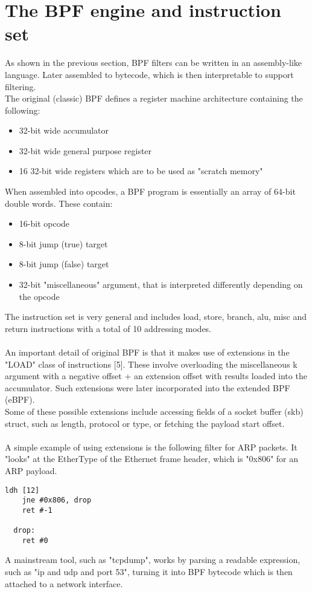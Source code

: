 \documentclass{l4proj}
\begin{document}
\section{The BPF engine and instruction set}
As shown in the previous section, BPF filters can be written in an assembly-like language. Later assembled to bytecode, which is then interpretable to support filtering.\\
The original (classic) BPF defines a register machine architecture containing the following:
\begin{itemize}
    \item 32-bit wide accumulator
    \item 32-bit wide general purpose register
    \item 16 32-bit wide registers which are to be used as "scratch memory"
\end{itemize}
When assembled into opcodes, a BPF program is essentially an array of 64-bit double words. These contain:
\begin{itemize}
    \item 16-bit opcode
    \item 8-bit jump (true) target
    \item 8-bit jump (false) target
    \item 32-bit "miscellaneous" argument, that is interpreted differently depending on the opcode
\end{itemize}
The instruction set is very general and includes load, store, branch, alu, misc and return instructions with a total of 10 addressing modes.\\\\
An important detail of original BPF is that it makes use of extensions in the "LOAD" class of instructions [5]. These involve overloading the miscellaneous k argument with a negative offset + an extension offset with results loaded into the accumulator. Such extensions were later incorporated into the extended BPF (eBPF).\\
Some of these possible extensions include accessing fields of a socket buffer (skb) struct, such as length, protocol or type, or fetching the payload start offset.\\\\
A simple example of using extensions is the following filter for ARP packets. It "looks" at the EtherType of the Ethernet frame header, which is "0x806" for an ARP payload.
\begin{lstlisting}[language=ebpfAsm]
    ldh [12]
    jne #0x806, drop
    ret #-1
    
  drop: 
    ret #0
\end{lstlisting}
A mainstream tool, such as "tcpdump", works by parsing a readable expression, such as "ip and udp and port 53", turning it into BPF bytecode which is then attached to a network interface.
\end{document}
